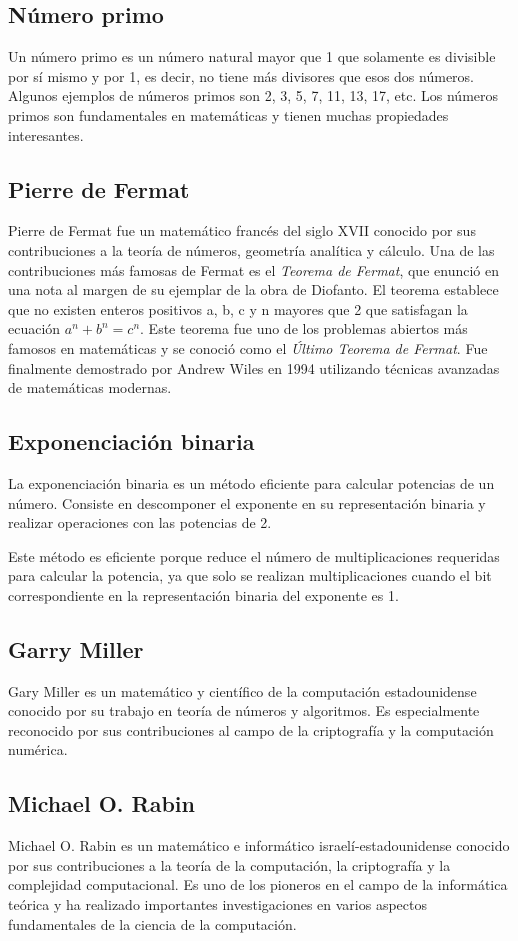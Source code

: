 \subsection{Número primo}
Un número primo es un número natural mayor que 1 que solamente es divisible por sí mismo y por 1, es decir, no tiene más divisores que esos dos números. Algunos ejemplos de números primos son 2, 3, 5, 7, 11, 13, 17, etc. Los números primos son fundamentales en matemáticas y tienen muchas propiedades interesantes.


\subsection{Pierre de Fermat}

Pierre de Fermat fue un matemático francés del siglo XVII conocido por sus contribuciones a la teoría de números, geometría analítica y cálculo. Una de las contribuciones más famosas de Fermat es el \emph{Teorema de Fermat}, que enunció en una nota al margen de su ejemplar de la obra de Diofanto. El teorema establece que no existen enteros positivos a, b, c y n mayores que 2 que satisfagan la ecuación $a^n + b^n = c^n$. Este teorema fue uno de los problemas abiertos más famosos en matemáticas y se conoció como el \emph{Último Teorema de Fermat}. Fue finalmente demostrado por Andrew Wiles en 1994 utilizando técnicas avanzadas de matemáticas modernas.

\subsection{Exponenciación binaria}
La exponenciación binaria es un método eficiente para calcular potencias de un número. Consiste en descomponer el exponente en su representación binaria y realizar operaciones con las potencias de 2.

Este método es eficiente porque reduce el número de multiplicaciones requeridas para calcular la potencia, ya que solo se realizan multiplicaciones cuando el bit correspondiente en la representación binaria del exponente es 1.


\subsection{Garry Miller}
Gary Miller es un matemático y científico de la computación estadounidense conocido por su trabajo en teoría de números y algoritmos. Es especialmente reconocido por sus contribuciones al campo de la criptografía y la computación numérica.

\subsection{Michael O. Rabin}
Michael O. Rabin es un matemático e informático israelí-estadounidense conocido por sus contribuciones a la teoría de la computación, la criptografía y la complejidad computacional. Es uno de los pioneros en el campo de la informática teórica y ha realizado importantes investigaciones en varios aspectos fundamentales de la ciencia de la computación.
